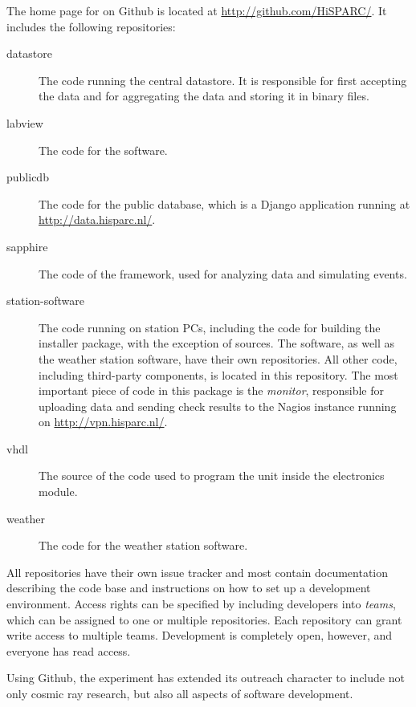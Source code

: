 The home page for \hisparc on Github is located at
\url{http://github.com/HiSPARC/}.  It includes the following repositories:
\begin{description}
\item[datastore]  The code running the central datastore.  It is responsible for
first accepting the data and for aggregating the data and storing it in binary
\hdf files.
\item[labview]  The code for the \hisparc \daq software.
\item[publicdb]  The code for the public database, which is a Django application
running at \url{http://data.hisparc.nl/}.
\item[sapphire]  The code of the \sapphire framework, used for analyzing
\hisparc data and simulating events.
\item[station-software] The code running on station PCs, including the code for
building the installer package, with the exception of \labview sources.  The
\hisparc \daq software, as well as the weather station \daq software, have their
own repositories.  All other code, including third-party components, is located
in this repository.  The most important piece of code in this package is the
\emph{monitor}, responsible for uploading data and sending check results to the
Nagios instance running on \url{http://vpn.hisparc.nl/}.
\item[vhdl]  The source of the  code used to program the
 unit inside the \hisparc electronics module.
\item[weather]  The code for the weather station \daq software.
\end{description}
%
All repositories have their own issue tracker and most contain documentation
describing the code base and instructions on how to set up a development
environment.  Access rights can be specified by including developers into
\emph{teams}, which can be assigned to one or multiple repositories.  Each
repository can grant write access to multiple teams.  Development is completely
open, however, and everyone has read access.

Using Github, the \hisparc experiment has extended its outreach character to
include not only cosmic ray research, but also all aspects of software
development.

